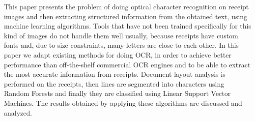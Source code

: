 This paper presents the problem of doing optical character recognition on receipt images and then extracting structured information from the obtained text, using machine learning algorithms. Tools that have not been trained specifically for this kind of images do not handle them well usually, because receipts have custom fonts and, due to size constraints, many letters are close to each other. In this paper we adapt existing methods for doing OCR, in order to achieve better performance than off-the-shelf commercial OCR engines and to be able to extract the most accurate information from receipts. Document layout analysis is performed on the receipts, then lines are segmented into characters using Random Forests and finally they are classified using Linear Support Vector Machines. The results obtained by applying these algorithms are discussed and analyzed. 